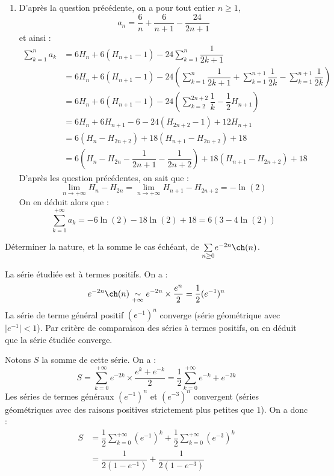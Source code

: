 \documentclass[a4paper,10pt]{report}
\newcommand{\Sum}[2]{\ensuremath{\textstyle{\sum\limits_{#1}^{#2}}}}
\begin{document}
\begin{enumerate}
\item D'après la question précédente, on a pour tout entier $n \geq 1$,
$$ a_n = \dfrac{6}{n} + \dfrac{6}{n+1} - \dfrac{24}{2n+1}$$
et ainsi :
\begin{align*}
\sum_{k=1}^n a_k & = 6 H_n + 6(H_{n+1}-1)- 24 \sum_{k=1}^n \dfrac{1}{2k+1} \\
& = 6 H_n + 6(H_{n+1}-1)- 24 \left( \sum_{k=1}^n \dfrac{1}{2k+1} +  \sum_{k=1}^{n+1} \dfrac{1}{2k} - \sum_{k=1}^{n+1} \dfrac{1}{2k} \right) \\
& =6 H_n + 6(H_{n+1}-1)-24 \left( \sum_{k=2}^{2n+2} \dfrac{1}{k} -  \dfrac{1}{2} H_{n+1} \right) \\
& = 6H_n + 6 H_{n+1} - 6 - 24 (H_{2n+2}-1) + 12 H_{n+1} \\
& = 6(H_n - H_{2n+2}) + 18(H_{n+1}- H_{2n+2}) + 18 \\
& = 6 \left( H_n - H_{2n} - \dfrac{1}{2n+1} - \dfrac{1}{2n+2} \right) + 18 (H_{n+1}- H_{2n+2})  + 18
\end{align*}
D'après les question précédentes, on sait que :
$$ \lim_{n \rightarrow + \infty} H_n- H_{2n} = \lim_{n \rightarrow + \infty} H_{n+1}- H_{2n+2} = - \ln(2)$$
On en déduit alors que :
$$ \sum_{k=1}^{+ \infty} a_k = -6\ln(2) -18 \ln(2) + 18 = 6(3- 4 \ln(2))$$
\end{enumerate}

\medskip

\begin{Exa} Déterminer la nature, et la somme le cas échéant, de $\Sum{n \geq 0}{} e^{-2n} \ch(n)$.
\end{Exa}

\corr La série étudiée est à termes positifs. On a :
$$ e^{-2n} \ch(n) \underset{+ \infty}{\sim} e^{-2n} \times \dfrac{e^n}{2} = \dfrac{1}{2} (e^{-1})^n$$
La série de terme général positif $(e^{-1})^n$ converge (série géométrique avec $\vert e^{-1} \vert <1$). Par critère de comparaison des séries à termes positifs, on en déduit que la série étudiée converge. 

\medskip

\noindent Notons $S$ la somme de cette série. On a :
$$ S = \sum_{k=0}^{+ \infty} e^{-2k} \times \dfrac{e^k + e^{-k}}{2} = \dfrac{1}{2} \sum_{k=0}^{+ \infty} e^{-k} + e^{-3k}$$
Les séries de termes généraux $(e^{-1})^n$ et $(e^{-3})^n$ convergent (séries géométriques avec des raisons positives strictement plus petites que $1$). On a donc :
\begin{align*}
S & = \dfrac{1}{2} \sum_{k=0}^{+ \infty} (e^{-1})^k + \dfrac{1}{2} \sum_{k=0}^{+ \infty} (e^{-3})^k \\
& = \dfrac{1}{2(1-e^{-1})} + \dfrac{1}{2(1-e^{-3})}
\end{align*}
\end{document}
